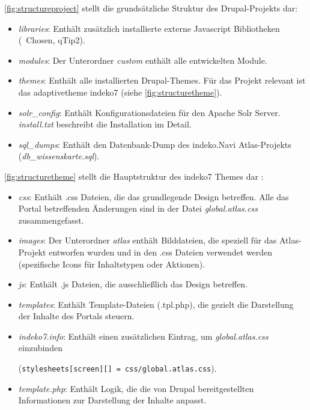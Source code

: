 \cref{fig:structureproject} stellt die grundsätzliche Struktur des Drupal-Projekts dar:
\begin{itemize}
	\item \textit{libraries}: Enthält zusätzlich installierte externe Javascript Bibliotheken (\zB\ Chosen, qTip2).

	\item \textit{modules}: Der Unterordner \textit{custom} enthält alle entwickelten Module.

	\item \textit{themes}: Enthält alle installierten Drupal-Themes. Für das Projekt relevant ist das adaptivetheme indeko7 (siehe \cref{fig:structuretheme}).

	\item \textit{solr\_config}: Enthält Konfigurationsdateien für den Apache Solr Server. \textit{install.txt} beschreibt die Installation im Detail.

	\item \textit{sql\_dumps}: Enthält den Datenbank-Dump des \acrshort{indeko}.Navi Atlas-Projekts  (\textit{db\_wissenskarte.sql}).
\end{itemize}



\cref{fig:structuretheme} stellt die Hauptstruktur des indeko7 Themes dar :
\begin{itemize}
	\item \textit{css}: Enthält .css Dateien, die das grundlegende Design betreffen. Alle das Portal betreffenden Änderungen sind in der Datei \textit{global.atlas.css} zusammengefasst.

	\item \textit{images}: Der Unterordner \textit{atlas} enthält Bilddateien, die speziell für das Atlas-Projekt entworfen wurden und in den .css Dateien verwendet werden (\zB spezifische Icons für Inhaltstypen oder Aktionen).

	\item \textit{js}: Enthält .js Dateien, die ausschließlich das Design betreffen.

	\item \textit{templates}: Enthält Template-Dateien (.tpl.php), die gezielt die Darstellung der Inhalte des Portals steuern.

	\item \textit{indeko7.info}: Enthält einen zusätzlichen Eintrag, um \textit{global.atlas.css} einzubinden

	(\lstinline|stylesheets[screen][] = css/global.atlas.css|).

	\item \textit{template.php}: Enthält Logik, die die von Drupal bereitgestellten Informationen zur Darstellung der Inhalte anpasst.

\end{itemize}



